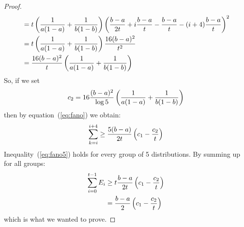 \begin{proof}
\begin{align*}
&= t\left(\frac{1}{a(1-a)} + \frac{1}{b(1-b)}\right)\left(\frac{b-a}{2t} + i\frac{b-a}{t} - \frac{b-a}{t} -(i+4)\frac{b-a}{t}\right)^2\\
&= t\left(\frac{1}{a(1-a)} + \frac{1}{b(1-b)}\right) \frac{16(b-a)^2}{t^2}\\
&= \frac{16(b-a)^2}{t} \left(\frac{1}{a(1-a)} + \frac{1}{b(1-b)}\right) 
\end{align*}
So, if we set $$c_2 = 16\frac{(b-a)^2}{\log5}\left(\frac{1}{a(1-a)} + \frac{1}{b(1-b)}\right)$$ 
then by equation~(\ref{eq:fano}) we obtain:
\begin{equation}\label{eq:fano5}
\sum_{k =i}^{i+4} \geq \frac{5(b-a)}{2t}\left(c_1 - \frac{c_2}{t}\right)
\end{equation}
Inequality~(\ref{eq:fano5}) holds for every group of 5 distributions. By summing up for all groups:
\begin{align*}
\sum_{i=0}^{t-1} E_i &\geq t \frac{b-a}{2t}\left(c_1 - \frac{c_2}{t}\right)\\
&= \frac{b-a}{2}\left(c_1 - \frac{c_2}{t}\right)
\end{align*}
which is what we wanted to prove. 


\end{proof}
